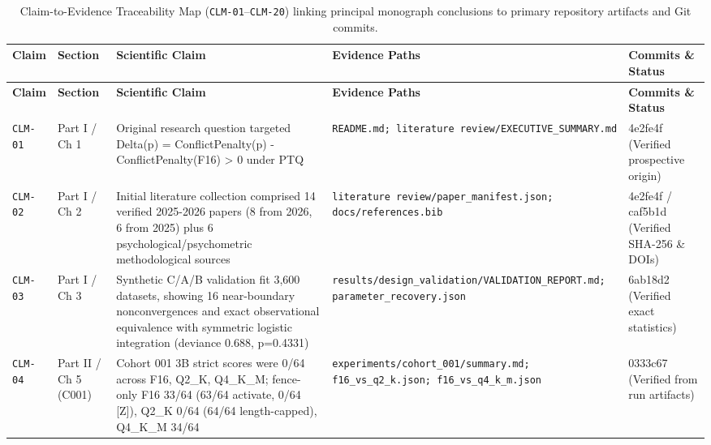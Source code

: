 {\footnotesize
\setlength{\tabcolsep}{3.5pt}
\begin{longtable}{@{}>{\raggedright\arraybackslash}p{1.2cm}>{\raggedright\arraybackslash}p{2.0cm}>{\raggedright\arraybackslash}p{4.8cm}>{\raggedright\arraybackslash}p{3.9cm}>{\raggedright\arraybackslash}p{2.5cm}@{}}
\caption{Claim-to-Evidence Traceability Map (\texttt{CLM-01}--\texttt{CLM-20}) linking principal monograph conclusions to primary repository artifacts and Git commits.}\label{tab:claim_evidence}\\
\toprule
\textbf{Claim} & \textbf{Section} & \textbf{Scientific Claim} & \textbf{Evidence Paths} & \textbf{Commits \& Status} \\
\midrule
\endfirsthead
\toprule
\textbf{Claim} & \textbf{Section} & \textbf{Scientific Claim} & \textbf{Evidence Paths} & \textbf{Commits \& Status} \\
\midrule
\endhead
\bottomrule
\endfoot
\texttt{CLM-\allowbreak{}01} & Part I /\allowbreak{} Ch 1 & Original research question targeted Delta(p) = ConflictPenalty(p) -\allowbreak{} ConflictPenalty(F16) > 0 under PTQ & \texttt{README.md; literature review/\allowbreak{}EXECUTIVE\_SUMMARY.md} & 4e2fe4f (Verified prospective origin) \\[2pt]
\texttt{CLM-\allowbreak{}02} & Part I /\allowbreak{} Ch 2 & Initial literature collection comprised 14 verified 2025-\allowbreak{}2026 papers (8 from 2026, 6 from 2025) plus 6 psychological/\allowbreak{}psychometric methodological sources & \texttt{literature review/\allowbreak{}paper\_manifest.json; docs/\allowbreak{}references.bib} & 4e2fe4f /\allowbreak{} caf5b1d (Verified SHA-\allowbreak{}256 \& DOIs) \\[2pt]
\texttt{CLM-\allowbreak{}03} & Part I /\allowbreak{} Ch 3 & Synthetic C/\allowbreak{}A/\allowbreak{}B validation fit 3,600 datasets, showing 16 near-\allowbreak{}boundary nonconvergences and exact observational equivalence with symmetric logistic integration (deviance 0.688, p=0.4331) & \texttt{results/\allowbreak{}design\_validation/\allowbreak{}VALIDATION\_REPORT.md; parameter\_recovery.json} & 6ab18d2 (Verified exact statistics) \\[2pt]
\texttt{CLM-\allowbreak{}04} & Part II /\allowbreak{} Ch 5 (C001) & Cohort 001 3B strict scores were 0/\allowbreak{}64 across F16, Q2\_K, Q4\_K\_M; fence-\allowbreak{}only F16 33/\allowbreak{}64 (63/\allowbreak{}64 activate, 0/\allowbreak{}64 [Z]), Q2\_K 0/\allowbreak{}64 (64/\allowbreak{}64 length-\allowbreak{}capped), Q4\_K\_M 34/\allowbreak{}64 & \texttt{experiments/\allowbreak{}cohort\_001/\allowbreak{}summary.md; f16\_vs\_q2\_k.json; f16\_vs\_q4\_k\_m.json} & 0333c67 (Verified from run artifacts) \\[2pt]

\end{longtable}}
